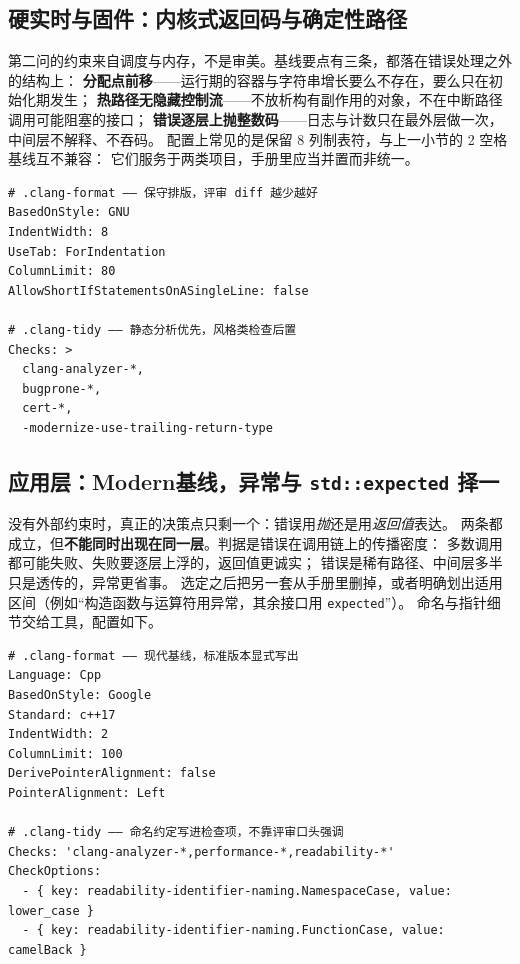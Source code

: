 \documentclass[12pt,a4paper,fontset=fandol]{ctexbook}
\newcommand{\Tp}[1]{\texttt{#1}}
\newcommand{\Lang}[1]{\textsf{#1}}
\newcommand{\DomMod}{\Lang{Modern}}
\begin{document}
\subsection{硬实时与固件：内核式返回码与确定性路径}
\label{sec:ch14-rtos-baseline}

第二问的约束来自调度与内存，不是审美。基线要点有三条，都落在错误处理之外的结构上：
\textbf{分配点前移}——运行期的容器与字符串增长要么不存在，要么只在初始化期发生；
\textbf{热路径无隐藏控制流}——不放析构有副作用的对象，不在中断路径调用可能阻塞的接口；
\textbf{错误逐层上抛整数码}——日志与计数只在最外层做一次，中间层不解释、不吞码。
配置上常见的是保留 8 列制表符，与上一小节的 2 空格基线互不兼容：
它们服务于两类项目，手册里应当并置而非统一。

\begin{lstlisting}[style=yamlstyle]
# .clang-format —— 保守排版，评审 diff 越少越好
BasedOnStyle: GNU
IndentWidth: 8
UseTab: ForIndentation
ColumnLimit: 80
AllowShortIfStatementsOnASingleLine: false

# .clang-tidy —— 静态分析优先，风格类检查后置
Checks: >
  clang-analyzer-*,
  bugprone-*,
  cert-*,
  -modernize-use-trailing-return-type
\end{lstlisting}

\subsection{应用层：\DomMod 基线，异常与 \Tp{std::expected} 择一}
\label{sec:ch14-app-baseline}

没有外部约束时，真正的决策点只剩一个：错误用\emph{抛}还是用\emph{返回值}表达。
两条都成立，但\textbf{不能同时出现在同一层}。判据是错误在调用链上的传播密度：
多数调用都可能失败、失败要逐层上浮的，返回值更诚实；
错误是稀有路径、中间层多半只是透传的，异常更省事。
选定之后把另一套从手册里删掉，或者明确划出适用区间（例如``构造函数与运算符用异常，其余接口用 \Tp{expected}''）。
命名与指针细节交给工具，配置如下。

\begin{lstlisting}[style=yamlstyle]
# .clang-format —— 现代基线，标准版本显式写出
Language: Cpp
BasedOnStyle: Google
Standard: c++17
IndentWidth: 2
ColumnLimit: 100
DerivePointerAlignment: false
PointerAlignment: Left

# .clang-tidy —— 命名约定写进检查项，不靠评审口头强调
Checks: 'clang-analyzer-*,performance-*,readability-*'
CheckOptions:
  - { key: readability-identifier-naming.NamespaceCase, value: lower_case }
  - { key: readability-identifier-naming.FunctionCase, value: camelBack }
\end{lstlisting}
\end{document}
